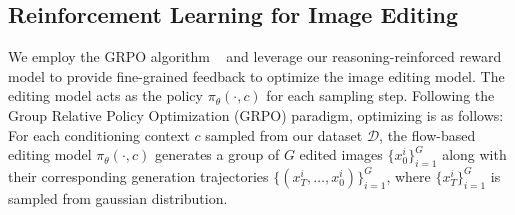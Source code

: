 

\subsection{Reinforcement Learning for Image Editing}
\label{sec:rl_for_editing}
We employ the GRPO algorithm ~\citep{liu2025flow} and leverage our reasoning-reinforced reward model to provide fine-grained feedback to optimize the image editing model.
The editing model acts as the policy $\pi_\theta(\cdot,c)$ for each sampling step. Following the Group Relative Policy Optimization (GRPO) paradigm, optimizing is as follows:
For each conditioning context $c$ sampled from our dataset $\mathcal{D}$, the flow-based editing model $\pi_\theta(\cdot,c)$ generates a group of $G$ edited images $\{x_0^i\}_{i=1}^G$ along with their corresponding generation trajectories $\{(x_T^i, \dots, x_0^i)\}_{i=1}^G$, where $\{x_T^i\}_{i=1}^G$ is sampled from gaussian distribution.

